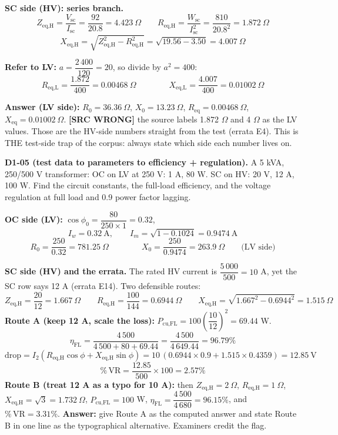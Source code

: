 \documentclass[11pt]{article}
\newcommand{\tagline}[1]{\textbf{\color{copper}#1}}
\newcommand{\srcwrong}[1]{\textbf{\color{red}[SRC WRONG]} #1}
\begin{document}
\textbf{SC side (HV): series branch.}
\[
Z_{\text{eq,H}} = \frac{V_{\text{sc}}}{I_{\text{sc}}} = \frac{92}{20.8} = 4.423\ \Omega
\qquad
R_{\text{eq,H}} = \frac{W_{\text{sc}}}{I_{\text{sc}}^{2}} = \frac{810}{20.8^{2}} = 1.872\ \Omega
\]
\[
X_{\text{eq,H}} = \sqrt{Z_{\text{eq,H}}^{2} - R_{\text{eq,H}}^{2}} = \sqrt{19.56 - 3.50} = 4.007\ \Omega
\]

\textbf{Refer to LV:} $a = \dfrac{2\,400}{120} = 20$, so divide by $a^{2} = 400$:
\[
R_{\text{eq,L}} = \frac{1.872}{400} = 0.00468\ \Omega
\qquad\qquad
X_{\text{eq,L}} = \frac{4.007}{400} = 0.01002\ \Omega
\]

\textbf{Answer (LV side):} $R_0 = 36.36\ \Omega$, $X_0 = 13.23\ \Omega$, $R_{\text{eq}} = 0.00468\ \Omega$, $X_{\text{eq}} = 0.01002\ \Omega$. \srcwrong{the source labels 1.872 $\Omega$ and 4 $\Omega$ as the LV values. Those are the HV-side numbers straight from the test (errata E4). This is THE test-side trap of the corpus: always state which side each number lives on.}

\vspace{2pt}

\tagline{D1-05 (test data to parameters to efficiency + regulation).} A 5 kVA, 250/500 V transformer: OC on LV at 250 V: 1 A, 80 W. SC on HV: 20 V, 12 A, 100 W. Find the circuit constants, the full-load efficiency, and the voltage regulation at full load and 0.9 power factor lagging.

\textbf{OC side (LV):} $\cos\phi_0 = \dfrac{80}{250 \times 1} = 0.32$,
\[
I_w = 0.32\ \text{A}, \qquad
I_m = \sqrt{1 - 0.1024} = 0.9474\ \text{A}
\]
\[
R_0 = \frac{250}{0.32} = 781.25\ \Omega
\qquad\qquad
X_0 = \frac{250}{0.9474} = 263.9\ \Omega
\qquad\text{(LV side)}
\]

\textbf{SC side (HV) and the errata.} The rated HV current is $\dfrac{5\,000}{500} = 10$ A, yet the SC row says 12 A (errata E14). Two defensible routes:
\[
Z_{\text{eq,H}} = \frac{20}{12} = 1.667\ \Omega
\qquad
R_{\text{eq,H}} = \frac{100}{144} = 0.6944\ \Omega
\qquad
X_{\text{eq,H}} = \sqrt{1.667^{2} - 0.6944^{2}} = 1.515\ \Omega
\]
\textbf{Route A (keep 12 A, scale the loss):} $P_{\text{cu,FL}} = 100 \left(\dfrac{10}{12}\right)^{2} = 69.44$ W.
\[
\eta_{\text{FL}} = \frac{4\,500}{4\,500 + 80 + 69.44} = \frac{4\,500}{4\,649.44} = 96.79\%
\]
\[
\text{drop} = I_2\left(R_{\text{eq,H}}\cos\phi + X_{\text{eq,H}}\sin\phi\right) = 10\,(0.6944 \times 0.9 + 1.515 \times 0.4359) = 12.85\ \text{V}
\]
\[
\%\,\text{VR} = \frac{12.85}{500} \times 100 = 2.57\%
\]
\textbf{Route B (treat 12 A as a typo for 10 A):} then $Z_{\text{eq,H}} = 2\ \Omega$, $R_{\text{eq,H}} = 1\ \Omega$, $X_{\text{eq,H}} = \sqrt{3} = 1.732\ \Omega$, $P_{\text{cu,FL}} = 100$ W, $\eta_{\text{FL}} = \dfrac{4\,500}{4\,680} = 96.15\%$, and $\%\,\text{VR} = 3.31\%$.
\textbf{Answer:} give Route A as the computed answer and state Route B in one line as the typographical alternative. Examiners credit the flag.
\end{document}
